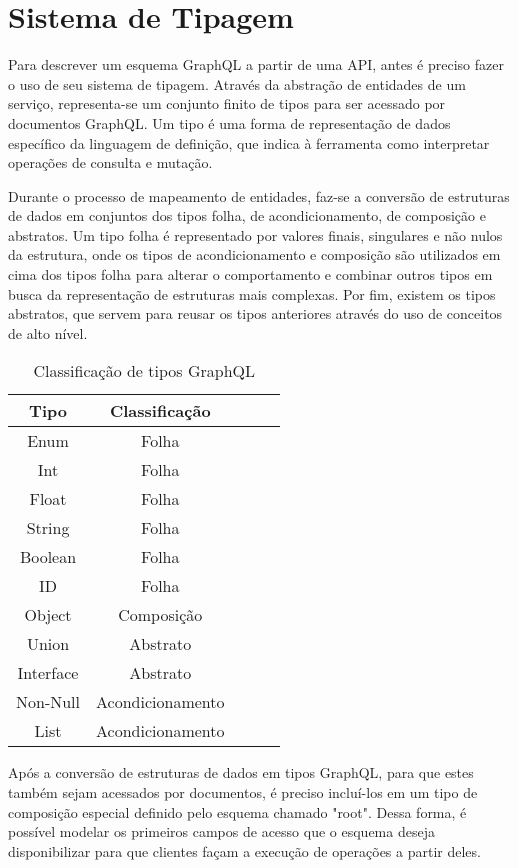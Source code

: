 \section[Sistema de Tipagem]{Sistema de Tipagem}

Para descrever um esquema GraphQL a partir de uma API, antes é preciso fazer o uso de seu sistema de tipagem. Através da abstração de entidades de um serviço, representa-se um conjunto finito de tipos para ser acessado por documentos GraphQL. Um tipo é uma forma de representação de dados específico da linguagem de definição, que indica à ferramenta como interpretar operações de consulta e mutação.

Durante o processo de mapeamento de entidades, faz-se a conversão de estruturas de dados em conjuntos dos tipos folha, de acondicionamento, de composição e abstratos. Um tipo folha é representado por valores finais, singulares e não nulos da estrutura, onde os tipos de acondicionamento e composição são utilizados em cima dos tipos folha para alterar o comportamento e combinar outros tipos em busca da representação de estruturas mais complexas. Por fim, existem os tipos abstratos, que servem para reusar os tipos anteriores através do uso de conceitos de alto nível.

\begin{table}[H]
  \centering
  \begin{tabular}{|c|c|c|c|c|}
    \hline
    Tipo & Classificação \\
    \hline
    Enum & Folha \\
    \hline
    Int & Folha \\
    \hline
    Float & Folha \\
    \hline
    String & Folha \\
    \hline
    Boolean & Folha \\
    \hline
    ID & Folha \\
    \hline
    Object & Composição \\
    \hline
    Union & Abstrato \\
    \hline
    Interface & Abstrato \\
    \hline
    Non-Null & Acondicionamento \\
    \hline
  	List & Acondicionamento \\
    \hline
  \end{tabular}
  \caption{Classificação de tipos GraphQL}
\end{table}

Após a conversão de estruturas de dados em tipos GraphQL, para que estes também sejam acessados por documentos, é preciso incluí-los em um tipo de composição especial definido pelo esquema chamado "root". Dessa forma, é possível modelar os primeiros campos de acesso que o esquema deseja disponibilizar para que clientes façam a execução de operações a partir deles.


